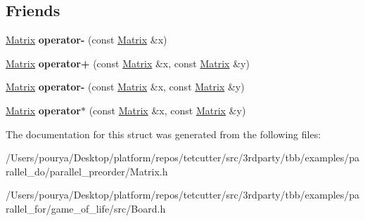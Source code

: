 \subsection*{Friends}
\begin{DoxyCompactItemize}
\item 
\hypertarget{classMatrix_adeb9d36cb543195959bf71277944221a}{}\hyperlink{classMatrix}{Matrix} {\bfseries operator-\/} (const \hyperlink{classMatrix}{Matrix} \&x)\label{classMatrix_adeb9d36cb543195959bf71277944221a}

\item 
\hypertarget{classMatrix_a63b47ace260551ab2d6b305fc23b6d04}{}\hyperlink{classMatrix}{Matrix} {\bfseries operator+} (const \hyperlink{classMatrix}{Matrix} \&x, const \hyperlink{classMatrix}{Matrix} \&y)\label{classMatrix_a63b47ace260551ab2d6b305fc23b6d04}

\item 
\hypertarget{classMatrix_a65b81a9cf7508fcf7977cecdd6d78d36}{}\hyperlink{classMatrix}{Matrix} {\bfseries operator-\/} (const \hyperlink{classMatrix}{Matrix} \&x, const \hyperlink{classMatrix}{Matrix} \&y)\label{classMatrix_a65b81a9cf7508fcf7977cecdd6d78d36}

\item 
\hypertarget{classMatrix_adaa05d328f5fad0780356c12dd282a4f}{}\hyperlink{classMatrix}{Matrix} {\bfseries operator$\ast$} (const \hyperlink{classMatrix}{Matrix} \&x, const \hyperlink{classMatrix}{Matrix} \&y)\label{classMatrix_adaa05d328f5fad0780356c12dd282a4f}

\end{DoxyCompactItemize}


The documentation for this struct was generated from the following files\+:\begin{DoxyCompactItemize}
\item 
/\+Users/pourya/\+Desktop/platform/repos/tetcutter/src/3rdparty/tbb/examples/parallel\+\_\+do/parallel\+\_\+preorder/Matrix.\+h\item 
/\+Users/pourya/\+Desktop/platform/repos/tetcutter/src/3rdparty/tbb/examples/parallel\+\_\+for/game\+\_\+of\+\_\+life/src/Board.\+h\end{DoxyCompactItemize}

